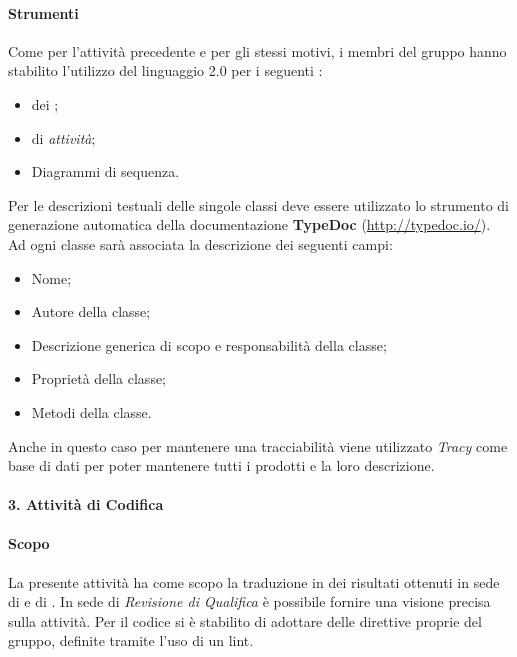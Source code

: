 		        \paragraph*{Strumenti}
		        Come per l'attivit\`a precedente e per gli stessi motivi, i membri del gruppo hanno stabilito l'utilizzo del linguaggio  2.0 per i seguenti
		        :
		        \begin{itemize}
			\item {} dei ; 
						
			\item {} di \textit{attivit\`a};
			\item Diagrammi di sequenza.
		        \end{itemize}
			Per le descrizioni testuali delle singole classi deve essere utilizzato lo strumento di generazione automatica della 
                        documentazione \textbf{TypeDoc} (\url{http://typedoc.io/}). Ad ogni classe sarà associata la descrizione dei seguenti campi:
			\begin{itemize}
				\item Nome;
				\item Autore della classe;
				\item Descrizione generica di scopo e responsabilità della classe;
				\item Proprietà della classe;
				\item Metodi della classe.
			\end{itemize}
                        Anche in questo caso per mantenere una tracciabilità viene utilizzato \textit{Tracy} come base di dati per poter mantenere tutti i  prodotti e la loro descrizione.
			 
		
		\paragraph*{3. Attività di Codifica}

                \paragraph*{Scopo}
                La presente attivit\`a ha come scopo la traduzione in  dei risultati ottenuti in sede
                di  e di .
                In sede di \textit{Revisione di Qualifica} \`e possibile fornire una visione precisa sulla attivit\`a.
                Per il codice  si \`e stabilito di adottare delle direttive proprie del gruppo, definite tramite l'uso di un lint.
